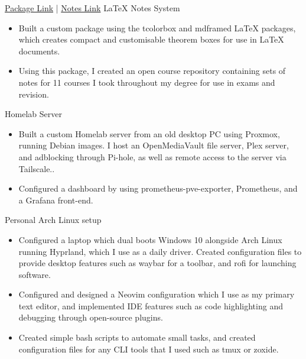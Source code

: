 \documentclass[../../cv-cs.tex]{subfiles}
\begin{document}
%
\cvlinkevent
{\href{https:www.github.com/leon0241/leon-latex-thmboxes}{Package Link} | \href{https:www.github.com/leon0241/leon-latex-notes}{Notes Link}}
{LaTeX Notes System}
{
    \begin{itemize}
	\item Built a custom package using the tcolorbox and mdframed LaTeX packages, which creates compact and customisable theorem boxes for use in LaTeX documents.
	\item Using this package, I created an open course repository containing sets of notes for 11 courses I took throughout my degree for use in exams and revision.
    \end{itemize}
}

\cvlinkevent
{}
{Homelab Server}
{
    \begin{itemize}
	\item Built a custom Homelab server from an old desktop PC using Proxmox, running Debian images. I host an OpenMediaVault file server, Plex server, and adblocking through Pi-hole, as well as remote access to the server via Tailscale..
	\item Configured a dashboard by using prometheus-pve-exporter, Prometheus, and a Grafana front-end.
    \end{itemize}
}

\cvlinkevent
{}
{Personal Arch Linux setup}
{
    \begin{itemize}
	\item Configured a laptop which dual boots Windows 10 alongside Arch Linux running Hyprland, which I use as a daily driver. Created configuration files to provide desktop features such as waybar for a toolbar, and rofi for launching software.
	\item Configured and designed a Neovim configuration which I use as my primary text editor, and implemented IDE features such as code highlighting and debugging through open-source plugins.
	\item Created simple bash scripts to automate small tasks, and created configuration files for any CLI tools that I used such as tmux or zoxide.
    \end{itemize}
}
\end{document}
